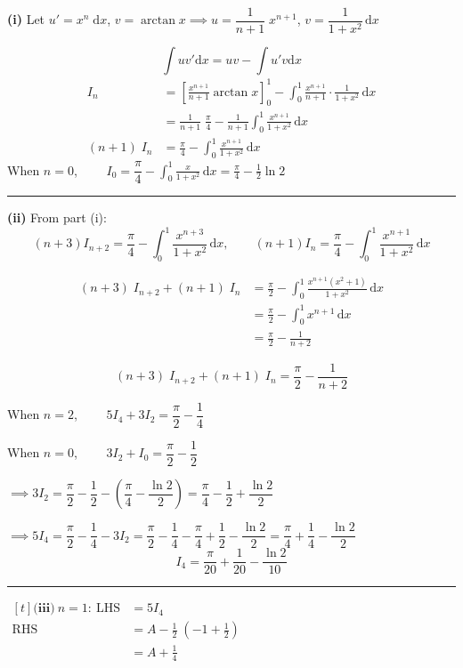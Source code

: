 ﻿\documentclass[12pt]{article}
\begin{document}
\textbf{(i)} Let $u' = x^n \;\mathrm{d}x$, $v = \arctan x \implies u=\dfrac{1}{n+1}\;x^{n+1}$, $v = \dfrac{1}{1+x^2}\,\mathrm{d}x$

$$\displaystyle\int uv'\mathrm{d}x=uv-\displaystyle\int u'v\mathrm{d}x$$
\begin{align*}
I_n &= \left[\frac{x^{n+1}}{n+1}\arctan x\right]_0^1 - \int_0^1 \frac{x^{n+1}}{n+1}\cdot\frac{1}{1+x^2}\,\mathrm{d}x\\
&= \frac{1}{n+1}\;\frac{\pi}{4} - \frac{1}{n+1}\int_0^1 \frac{x^{n+1}}{1+x^2}\,\mathrm{d}x\\
(n+1)\;I_n &= \frac{\pi}{4} - \int_0^1 \frac{x^{n+1}}{1+x^2}\,\mathrm{d}x
\end{align*}
When $n=0$, $\qquad I_0 = \dfrac{\pi}{4} - \displaystyle\int_0^1 \frac{x}{1+x^2}\,\mathrm{d}x = \frac{\pi}{4} - \frac{1}{2}\ln 2$



\bigskip\hrule\bigskip
\textbf{(ii)} From part (i):
$$(n+3)I_{n+2} = \frac{\pi}{4} - \int_0^1 \frac{x^{n+3}}{1+x^2}\,\mathrm{d}x, \qquad (n+1)I_n = \frac{\pi}{4} - \int_0^1 \frac{x^{n+1}}{1+x^2}\,\mathrm{d}x$$

\begin{align*}
(n+3)\;I_{n+2} + (n+1)\;I_n &= \frac{\pi}{2} - \int_0^1 \frac{x^{n+1}(x^2+1)}{1+x^2}\,\mathrm{d}x\\
&= \frac{\pi}{2} - \int_0^1 x^{n+1}\,\mathrm{d}x\\
&= \frac{\pi}{2} - \frac{1}{n+2}
\end{align*}

$$\boxed{(n+3)\;I_{n+2} + (n+1)\;I_n = \frac{\pi}{2} - \frac{1}{n+2}}$$

When $n=2$, $\qquad 5I_4 + 3I_2 = \dfrac{\pi}{2} - \dfrac{1}{4}$

When $n=0$, $\qquad 3I_2 + I_0 = \dfrac{\pi}{2} - \dfrac{1}{2}$

$\implies 3I_2 = \dfrac{\pi}{2} - \dfrac{1}{2} - \left(\dfrac{\pi}{4} - \dfrac{\ln 2}{2}\right) = \dfrac{\pi}{4} - \dfrac{1}{2} + \dfrac{\ln 2}{2}$

$\implies 5I_4 = \dfrac{\pi}{2} - \dfrac{1}{4} - 3I_2 = \dfrac{\pi}{2} - \dfrac{1}{4} - \dfrac{\pi}{4} + \dfrac{1}{2} - \dfrac{\ln 2}{2} = \dfrac{\pi}{4} + \dfrac{1}{4} - \dfrac{\ln 2}{2}$
$$\boxed{I_4 = \frac{\pi}{20} + \frac{1}{20} - \frac{\ln 2}{10}}$$




\bigskip\hrule\bigskip

\noindent
\(
\begin{aligned}[t]
\textbf{(iii)}\ n=1:\ \text{LHS} &= 5I_4\\
\text{RHS} &= A - \frac{1}{2}\;\left( -1 + \frac{1}{2}\right)\\
&= A + \frac{1}{4}
\end{aligned}
\)
\end{document}
